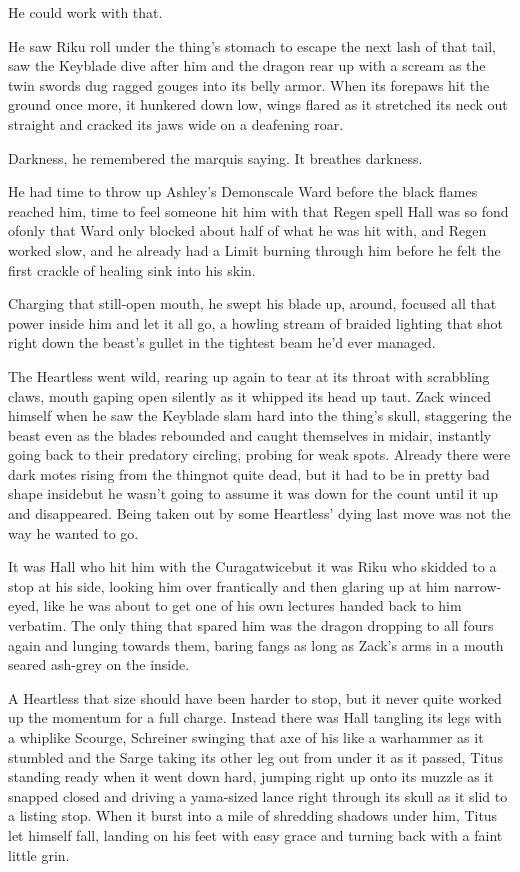 He could work with that.

He saw Riku roll under the thing's stomach to escape the next lash of that tail, saw the Keyblade dive after him and the dragon rear up with a scream as the twin swords dug ragged gouges into its belly armor. When its forepaws hit the ground once more, it hunkered down low, wings flared as it stretched its neck out straight and cracked its jaws wide on a deafening roar.

Darkness, he remembered the marquis saying. It breathes darkness.

He had time to throw up Ashley's Demonscale Ward before the black flames reached him, time to feel someone hit him with that Regen spell Hall was so fond of\textemdash only that Ward only blocked about half of what he was hit with, and Regen worked slow, and he already had a Limit burning through him before he felt the first crackle of healing sink into his skin.

Charging that still-open mouth, he swept his blade up, around, focused all that power inside him and let it all go, a howling stream of braided lighting that shot right down the beast's gullet in the tightest beam he'd ever managed.

The Heartless went wild, rearing up again to tear at its throat with scrabbling claws, mouth gaping open silently as it whipped its head up taut. Zack winced himself when he saw the Keyblade slam hard into the thing's skull, staggering the beast even as the blades rebounded and caught themselves in midair, instantly going back to their predatory circling, probing for weak spots. Already there were dark motes rising from the thing\textemdash not quite dead, but it had to be in pretty bad shape inside\textemdash but he wasn't going to assume it was down for the count until it up and disappeared. Being taken out by some Heartless' dying last move was not the way he wanted to go.

It was Hall who hit him with the Curaga\textemdash twice\textemdash but it was Riku who skidded to a stop at his side, looking him over frantically and then glaring up at him narrow-eyed, like he was about to get one of his own lectures handed back to him verbatim. The only thing that spared him was the dragon dropping to all fours again and lunging towards them, baring fangs as long as Zack's arms in a mouth seared ash-grey on the inside.

A Heartless that size should have been harder to stop, but it never quite worked up the momentum for a full charge. Instead there was Hall tangling its legs with a whiplike Scourge, Schreiner swinging that axe of his like a warhammer as it stumbled and the Sarge taking its other leg out from under it as it passed, Titus standing ready when it went down hard, jumping right up onto its muzzle as it snapped closed and driving a yama-sized lance right through its skull as it slid to a listing stop. When it burst into a mile of shredding shadows under him, Titus let himself fall, landing on his feet with easy grace and turning back with a faint little grin.

